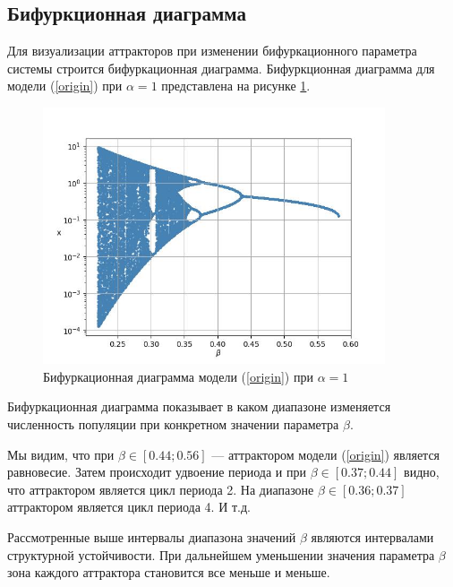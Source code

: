\subsection{Бифуркционная диаграмма}    

    Для визуализации аттракторов при изменении бифуркационного параметра системы строится бифуркационная диаграмма. Бифуркционная диаграмма для модели (\ref{origin}) при \(\alpha = 1\) представлена на рисунке \ref{bifurcation}.

    \begin{figure}
        \centering
        \includegraphics[width=0.9\textwidth]{deterministic/images/bifurcation.jpg}

        \captionsetup{justification=centering}
        \caption{Бифуркационная диаграмма модели (\ref{origin}) при \(\alpha = 1\)}
        \label{bifurcation}
    \end{figure}

    Бифуркационная диаграмма показывает в каком диапазоне изменяется численность популяции при конкретном значении параметра \(\beta\).

    Мы видим, что при \(\beta \in [0.44; 0.56]\) --- аттрактором модели (\ref{origin}) является равновесие. Затем происходит удвоение периода и при \(\beta \in [0.37; 0.44]\) видно, что аттрактором является цикл периода 2. На диапазоне \(\beta \in [0.36; 0.37]\) аттрактором является цикл периода 4. И т.д.
        
    Рассмотренные выше интервалы диапазона значений \(\beta\) являются интервалами структурной устойчивости. При дальнейшем уменьшении значения параметра \(\beta\) зона каждого аттрактора становится все меньше и меньше. 
        
